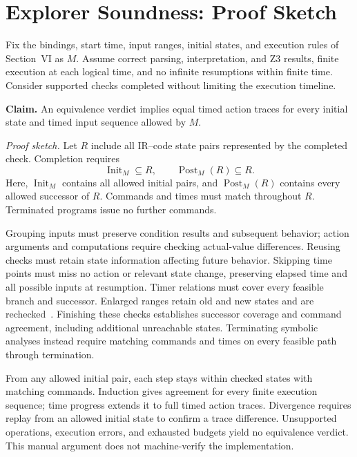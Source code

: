 \section{Explorer Soundness: Proof Sketch}
\label{app:explorer-soundness}

Fix the bindings, start time, input ranges, initial states, and execution rules of Section~VI as $M$. Assume correct parsing, interpretation, and Z3 results, finite execution at each logical time, and no infinite resumptions within finite time. Consider supported checks completed without limiting the execution timeline.

\textbf{Claim.} An equivalence verdict implies equal timed action traces for every initial state and timed input sequence allowed by $M$.

\textit{Proof sketch.} Let $R$ include all IR--code state pairs represented by the completed check. Completion requires
\[
  \operatorname{Init}_M\subseteq R,\qquad
  \operatorname{Post}_M(R)\subseteq R.
\]
Here, $\operatorname{Init}_M$ contains all allowed initial pairs, and $\operatorname{Post}_M(R)$ contains every allowed successor of $R$. Commands and times must match throughout $R$. Terminated programs issue no further commands.

Grouping inputs must preserve condition results and subsequent behavior; action arguments and computations require checking actual-value differences. Reusing checks must retain state information affecting future behavior. Skipping time points must miss no action or relevant state change, preserving elapsed time and all possible inputs at resumption. Timer relations must cover every feasible branch and successor. Enlarged ranges retain old and new states and are rechecked~\cite{cousot1977}. Finishing these checks establishes successor coverage and command agreement, including additional unreachable states. Terminating symbolic analyses instead require matching commands and times on every feasible path through termination.

From any allowed initial pair, each step stays within checked states with matching commands. Induction gives agreement for every finite execution sequence; time progress extends it to full timed action traces. Divergence requires replay from an allowed initial state to confirm a trace difference. Unsupported operations, execution errors, and exhausted budgets yield no equivalence verdict. This manual argument does not machine-verify the implementation.
